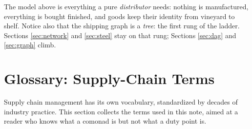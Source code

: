 \documentclass[11pt,a4paper]{article}
\theoremstyle{plain}
\theoremstyle{definition}
\theoremstyle{remark}
\begin{document}
The model above is everything a pure \emph{distributor} needs:
nothing is manufactured, everything is bought finished, and goods
keep their identity from vineyard to shelf. Notice also that the
shipping graph is a \emph{tree}: the first rung of the ladder.
Sections \ref{sec:network} and \ref{sec:steel} stay on that rung;
Sections \ref{sec:dag} and \ref{sec:graph} climb.

\section{Glossary: Supply-Chain Terms}\label{sec:glossary}

Supply chain management has its own vocabulary, standardized by decades
of industry practice. This section collects the terms used in this
note, aimed at a reader who knows what a comonad is but not what a
duty point is.
\end{document}
